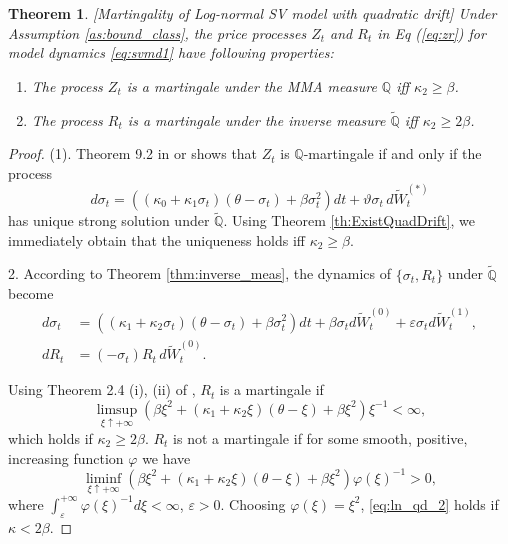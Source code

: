 \documentclass[11pt,a4paper] {article}
\newtheorem{theorem}{Theorem}[section]
\begin{document}
\begin{theorem}\label{thm::bounds_LN_model_quad_drift}[Martingality of Log-normal SV model with quadratic drift]
Under Assumption \ref{as:bound_class}, the price processes $Z_{t}$ and $R_{t}$ in Eq (\ref{eq:zr}) for model dynamics \eqref{eq:svmd1} have following properties:
\begin{enumerate}%
\item The process $Z_t$ is a martingale under the MMA measure $\mathbb{Q}$ iff $\kappa_2\ge \beta$.

\item\label{item::inverse_matringale} The process $R_t$ is a martingale under the inverse measure $\tilde{\mathbb{Q}}$ iff $\kappa_2\ge 2\beta$.
\end{enumerate}
\end{theorem}
%
\begin{proof}

(1). Theorem 9.2 in \cite{Lewis2000} or \cite{Sin1998} shows that $Z_t$ is $\mathbb{Q}$-martingale if and only if the process
\begin{equation*}
d\sigma_t=((\kappa_0+\kappa_1\sigma_t)(\theta-\sigma_t)+\beta \sigma_t^2)dt + \vartheta \sigma_t\,d\widetilde W^{(*)}_{t}
\end{equation*}
has unique strong solution under $\tilde{\mathbb{Q}}$. Using Theorem \ref{th:ExistQuadDrift}, we immediately obtain that the uniqueness holds iff  $\kappa_2\ge \beta$. 


2. According to Theorem \ref{thm:inverse_meas}, the dynamics of $\{\sigma_t, R_t\}$ under $\tilde{\mathbb{Q}}$ become
\begin{equation}\label{eq:ln_qd_1}
\begin{split}
d\sigma_{t}& =\left((\kappa_{1}+\kappa_2\sigma_t)(\theta-\sigma_t)+\beta\sigma_t^2\right)dt+  \beta  \sigma_{t}d\widetilde W^{(0)}_{t} +  \varepsilon \sigma_{t} d\widetilde W^{(1)}_{t},\\
dR_t&=(-\sigma_t)R_t\,d\widetilde W_t^{(0)}.
\end{split}
\end{equation}

Using Theorem 2.4 (i), (ii) of \cite{Lions2007}, $R_t$ is a martingale if
\begin{equation*}
\limsup_{\xi\uparrow +\infty}\left(\beta\xi^2+(\kappa_1+\kappa_2\xi)(\theta-\xi)+\beta\xi^2\right)\xi^{-1}<\infty,
\end{equation*}
which holds if $\kappa_2\ge 2\beta$. $R_t$ is not a martingale if for some smooth, positive, increasing function $\varphi$ we have
\begin{equation}\label{eq:ln_qd_2}
\liminf_{\xi\uparrow +\infty}\left(\beta\xi^2+(\kappa_1+\kappa_2\xi)(\theta-\xi)+\beta\xi^2\right)\varphi(\xi)^{-1}>0,
\end{equation}
where $\int_\varepsilon^{+\infty}\varphi(\xi)^{-1}d\xi<\infty$, $\varepsilon>0$.
Choosing $\varphi(\xi)=\xi^2$, \eqref{eq:ln_qd_2} holds if $\kappa<2\beta$.
\end{proof}
\end{document}

